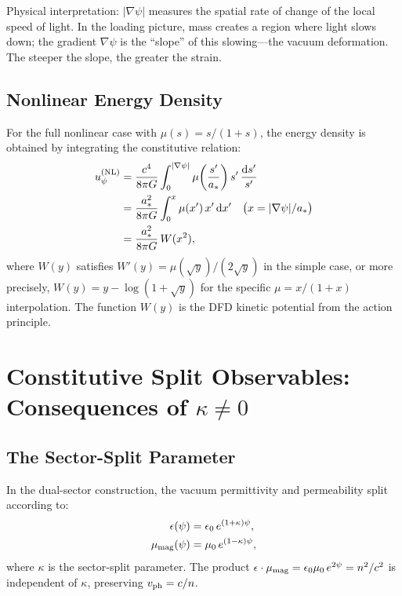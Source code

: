 \documentclass[11pt]{article}
\newcommand{\dd}{\mathrm{d}}
\begin{document}
Physical interpretation: $|\nabla\psi|$ measures the spatial rate of change
of the local speed of light.  In the loading picture, mass creates a
region where light slows down; the gradient $\nabla\psi$ is the ``slope''
of this slowing---the vacuum deformation.  The steeper the slope, the
greater the strain.

\subsection{Nonlinear Energy Density}

For the full nonlinear case with $\mu(s) = s/(1+s)$, the energy density
is obtained by integrating the constitutive relation:
\begin{align}
u_\psi^{\rm (NL)} &= \frac{c^4}{8\pi G}\int_0^{|\nabla\psi|}
\mu\!\left(\frac{s'}{a_*}\right) s'\,\frac{\dd s'}{s'} \nonumber\\
&= \frac{a_*^2}{8\pi G}\int_0^{x} \mu(x')\,x'\,\dd x'
\quad \bigl(x = |\nabla\psi|/a_*\bigr) \nonumber\\
&= \frac{a_*^2}{8\pi G}\, W(x^2),
\end{align}
where $W(y)$ satisfies $W'(y) = \mu(\sqrt{y})/(2\sqrt{y})$ in the simple case,
or more precisely, $W(y) = y - \log(1 + \sqrt{y})$ for the specific $\mu = x/(1+x)$
interpolation.  The function $W(y)$ is the DFD kinetic potential from the action principle.

\section{Constitutive Split Observables: Consequences of $\kappa \neq 0$}
\label{sec:kappa}

\subsection{The Sector-Split Parameter}

In the dual-sector construction, the vacuum permittivity and permeability
split according to:
\begin{align}
\epsilon(\psi) &= \epsilon_0\, e^{(1+\kappa)\psi}, \label{eq:eps-split}\\
\mu_{\rm mag}(\psi) &= \mu_0\, e^{(1-\kappa)\psi}, \label{eq:mu-split}
\end{align}
where $\kappa$ is the sector-split parameter.  The product
$\epsilon\cdot\mu_{\rm mag} = \epsilon_0\mu_0\, e^{2\psi} = n^2/c^2$
is independent of $\kappa$, preserving $v_{\rm ph} = c/n$.
\end{document}
